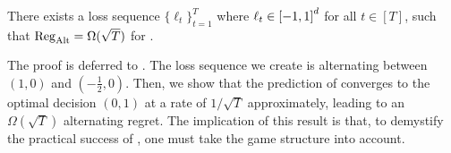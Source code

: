 \begin{theorem}\label{thm: PRM+}
    There exists a loss sequence $\{\ell_t\}_{t=1}^T$ where $\ell_t\in\left[-1,1\right]^d$ for all $t\in[T]$, such that $\mathrm{Reg}_{\mathrm{Alt}}=
    \Omega(\sqrt{T})$ for \PRM.
\end{theorem}
The proof is deferred to . The loss sequence we create is alternating between $(1,0)$ and $(-\frac{1}{2},0)$. Then, we show that the prediction of \PRM converges to the optimal decision $(0,1)$ at a rate of $1/\sqrt{T}$ approximately, leading to an $\Omega(\sqrt{T})$ alternating regret. 
The implication of this result is that, 
to demystify the practical success of \PRM,
one must take the game structure into account.
